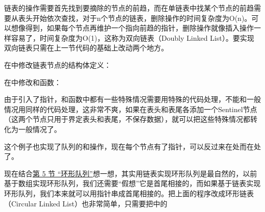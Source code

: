 链表的操作需要首先找到要摘除的节点的前趋，而在单链表中找某个节点的前趋需要从表头开始依次查找，对于n个节点的链表，删除操作的时间复杂度为O(n)。可以想像得到，如果每个节点再维护一个指向前趋的指针，删除操作就像插入操作一样容易了，时间复杂度为O(1)，这称为双向链表（Doubly Linked List）。要实现双向链表只需在上一节代码的基础上改动两个地方。



在中修改链表节点的结构体定义：




在中修改和函数：





由于引入了指针，和函数中都有一些特殊情况需要用特殊的代码处理，不能和一般情况用同样的代码处理，这非常不爽，如果在表头和表尾各添加一个Sentinel节点（这两个节点只用于界定表头和表尾，不保存数据），就可以把这些特殊情况都转化为一般情况了。








这个例子也实现了队列的和操作，现在每个节点有了指针，可以反过来在处而在处了。



现在结合\hyperlink{db.ch12s05.id2750902}{第 5 节 “环形队列”}想一想，其实用链表实现环形队列是最自然的，以前基于数组实现环形队列，我们还需要“假想”它是首尾相接的，而如果基于链表实现环形队列，我们本来就可以用指针串成首尾相接的。把上面的程序改成环形链表（Circular Linked List）也非常简单，只需要把中的


